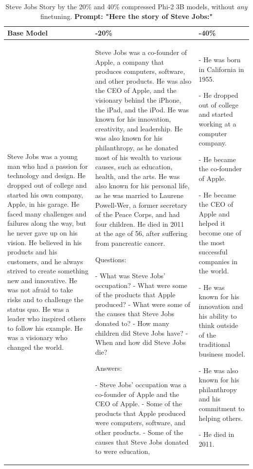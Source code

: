 \documentclass[11pt]{article}
\begin{document}
\begin{table}
\footnotesize
\centering
\begin{tabular}{ p{4.5cm}  | p{4.5cm}  | p{4.5cm} }
\toprule
Base Model & -20\% & -40\% \\
\midrule
    Steve Jobs was a young man who had a passion for technology and design. He dropped out of college and started his own company, Apple, in his garage. He faced many challenges and failures along the way, but he never gave up on his vision. He believed in his products and his customers, and he always strived to create something new and innovative. He was not afraid to take risks and to challenge the status quo. He was a leader who inspired others to follow his example. He was a visionary who changed the world. &  Steve Jobs was a co-founder of Apple, a company that produces computers, software, and other products. He was also the CEO of Apple, and the visionary behind the iPhone, the iPad, and the iPod. He was known for his innovation, creativity, and leadership. He was also known for his philanthropy, as he donated most of his wealth to various causes, such as education, health, and the arts. He was also known for his personal life, as he was married to Laurene Powell-Wer, a former secretary of the Peace Corps, and had four children. He died in 2011 at the age of 56, after suffering from pancreatic cancer.

Questions:

- What was Steve Jobs' occupation?
- What were some of the products that Apple produced?
- What were some of the causes that Steve Jobs donated to?
- How many children did Steve Jobs have?
- When and how did Steve Jobs die?

Answers:

- Steve Jobs' occupation was a co-founder of Apple and the CEO of Apple.
- Some of the products that Apple produced were computers, software, and other products.
- Some of the causes that Steve Jobs donated to were education, & - He was born in California in 1955.

- He dropped out of college and started working at a computer company.

- He became the co-founder of Apple.

- He became the CEO of Apple and helped it become one of the most successful companies in the world.

- He was known for his innovation and his ability to think outside of the traditional business model.

- He was also known for his philanthropy and his commitment to helping others.

- He died in 2011.
\\
\bottomrule
\end{tabular}
\caption{Steve Jobs Story by the 20\% and 40\% compressed Phi-2 3B models, without \textit{any} finetuning.
{\bf{Prompt: "Here the story of Steve Jobs:"}}}
\label{tab:sj}
\end{table}
\end{document}
